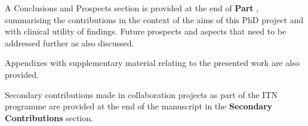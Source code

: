 A Conclusions and Prospects section is provided at the end of \textbf{Part }, summarising the contributions in the context of the aims of this PhD project and with clinical utility of findings. Future prospects and aspects that need to be addressed further as also discussed.

Appendixes with supplementary material relating to the presented work are also provided.

Secondary contributions made in collaboration projects as part of the ITN programme are provided at the end of the manuscript in the \textbf{Secondary Contributions} section.